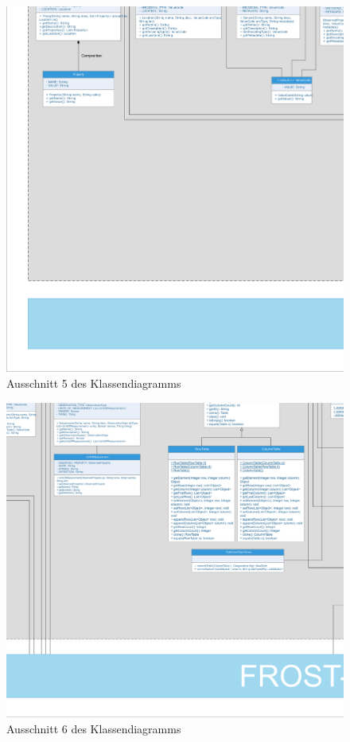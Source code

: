 \begin{figure}[!h]
\centering
\includegraphics[scale=0.4]{uml/screenshots/frithjof/slice_1_0}
\caption{Ausschnitt 5 des Klassendiagramms}
\end{figure}
\clearpage

\begin{figure}[!h]
\centering
\includegraphics[scale=0.4]{uml/screenshots/frithjof/slice_1_1}
\caption{Ausschnitt 6 des Klassendiagramms}
\end{figure}
\clearpage

